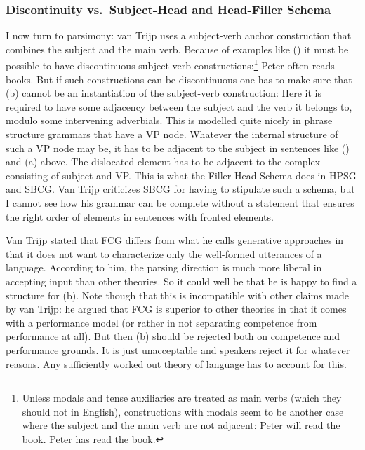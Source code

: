 \subsubsection{Discontinuity vs.\ Subject-Head and Head-Filler Schema}
\label{sec-discontinuous-constituents-fcg}

I now turn to parsimony: van Trijp uses a subject-verb anchor construction that combines the subject
and the main verb. Because of examples like () it must be possible to have discontinuous subject-verb constructions:\footnote{%
  Unless modals and tense auxiliaries are treated as main verbs (which they should not in English), constructions with
  modals seem to be another case where the subject and the main verb are not adjacent:
  \eal
  \ex Peter will read the book.
  \ex Peter has read the book.
  \zllast
} 
\ea
Peter often reads books.
\z
But if such constructions can be discontinuous one has to make sure that (b) cannot be an
instantiation of the subject-verb construction:
\eal
{}
\zl
Here it is required to have some adjacency between the subject and the verb it belongs to, modulo
some intervening adverbials. This is modelled quite nicely in phrase structure grammars that have a
VP node. Whatever the internal structure of such a VP node may be, it has to be adjacent to the
subject in sentences like  () and (a) above. The dislocated element has to be adjacent to the complex
consisting of subject and VP. This is what the Filler-Head Schema does in HPSG and SBCG. Van Trijp
criticizes SBCG for having to stipulate such a schema, but I cannot see how his grammar can be
complete without a statement that ensures the right order of elements in sentences with fronted
elements.

Van Trijp stated that FCG differs from what he calls generative approaches in that it does not want
to characterize only the well-formed utterances of a language. According to him, the parsing direction
 is much more liberal in accepting input than other theories. So it could well be that he
is happy to find a structure for (b). Note though that this is incompatible with other claims
made by van Trijp: he argued that FCG is superior to other theories in that it comes with a performance
model (or rather in not separating competence from performance at all). But then (b) should be
rejected both on competence and performance grounds. It is just unacceptable and speakers reject it
for whatever reasons. Any sufficiently worked out theory of language has to account for this.



